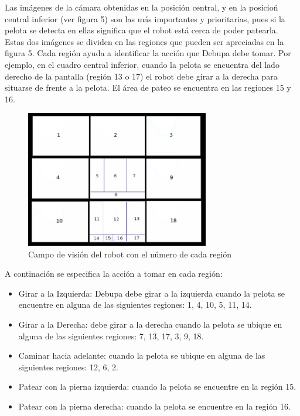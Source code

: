 \documentclass[tikz,conference, letterpaper]{IEEEtranMC1}
\begin{document}
Las im\'agenes de la c\'amara obtenidas en la posici\'on central, y en la posicio\'n central inferior (ver figura 5) son las m\'as importantes y prioritarias, pues si la pelota se detecta en ellas significa que el robot est\'a cerca de poder patearla. Estas dos im\'agenes se dividen en las regiones que pueden ser apreciadas en la figura 5. Cada región ayuda a identificar la acción que Debupa debe tomar. Por ejemplo, en el cuadro central inferior, cuando la pelota se encuentra del lado derecho de la pantalla (región 13 o 17) el robot debe girar a la derecha para situarse de frente a la pelota. El \'area de pateo se encuentra en las regiones 15 y 16.

\begin{figure}
 \includegraphics[height=6cm]{discretizacion.png}
 \caption{Campo de visión del robot con el número de cada región}
 	\label{fig:figura4}
 \end{figure} 


A continaci\'on se especifica la acción a tomar en cada región:

\begin{itemize}
\item Girar a la Izquierda: Debupa debe girar a la izquierda cuando la pelota se encuentre en alguna de las siguientes regiones: 1, 4, 10, 5, 11, 14.

\item Girar a la Derecha: debe girar a la derecha cuando la pelota se ubique en alguna de las siguientes regiones: 7, 13, 17, 3, 9, 18. 

\item Caminar hacia adelante: cuando la pelota se ubique en alguna de las siguientes regiones: 12, 6, 2.

\item Patear con la pierna izquierda: cuando la pelota se encuentre en la región 15.

\item Patear con la pierna derecha: cuando la pelota se encuentre en la región 16.
\end{itemize}
\end{document}
